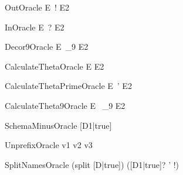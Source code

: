 \documentclass{article}
\newcommand{\unprefix}{\mathrel{unprefix}}
\begin{document}
\begin{zedoracle}{OutOracle}
  E~! \is E2
\end{zedoracle}

\begin{zedoracle}{InOracle}
  E~? \is E2
\end{zedoracle}

\begin{zedoracle}{Decor9Oracle}
  E~_9 \is E2
\end{zedoracle}

\begin{zedoracle}{CalculateThetaOracle}
  \theta E \is E2
\end{zedoracle}

\begin{zedoracle}{CalculateThetaPrimeOracle}
  \theta E~' \is E2
\end{zedoracle}

\begin{zedoracle}{CalculateTheta9Oracle}
  \theta E~ _9 \is E2
\end{zedoracle}

\begin{zedoracle}{SchemaMinusOracle}
  [D1|true] \schemaminus [D2|true] \is [D3|true]
\end{zedoracle}

\begin{zedoracle}{UnprefixOracle}
  v1 \unprefix v2 \is v3
\end{zedoracle}

\begin{zedoracle}{SplitNamesOracle}
  (split [D|true]) \is ([D1|true]? \land [D2|true] \land
                        [D3|true]' \land [D4|true]!)
\end{zedoracle}
\end{document}
